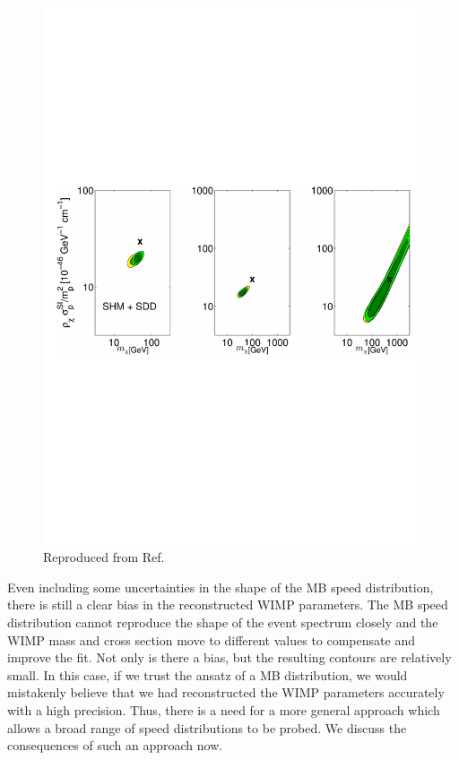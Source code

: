 \begin{figure}[h]
  \includegraphics[trim={0cm 9cm 0cm 9cm},clip,width=\textwidth]{Speed/PeterRecon.pdf}
  \caption[Biased reconstruction of WIMP parameters]{ Reproduced from Ref.~\cite{Peter:2011}}
  \label{fig:Speed:PeterRecon}
\end{figure}

Even including some uncertainties in the shape of the MB speed distribution, there is still a clear bias in the reconstructed WIMP parameters. The MB speed distribution cannot reproduce the shape of the event spectrum closely and the WIMP mass and cross section move to different values to compensate and improve the fit. Not only is there a bias, but the resulting contours are relatively small. In this case, if we trust the ansatz of a MB distribution, we would mistakenly believe that we had reconstructed the WIMP parameters accurately with a high precision. Thus, there is a need for a more general approach which allows a broad range of speed distributions to be probed. We discuss the consequences of such an approach now. 

